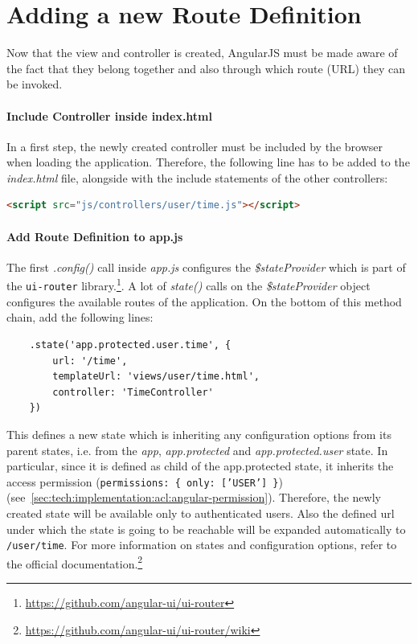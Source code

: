 \documentclass[nochapterpage,nopartpage,noheadingspace,numbersubsubsec,bigchapter,colorback,accentcolor=tud9c,10pt]{tudreport}
\begin{document}
  \section{Adding a new Route Definition}
  \label{sec:tech:handson:add-route}

    Now that the view and controller is created, AngularJS must be made aware of the fact that they belong together and also through which route (URL) they can be invoked.

  \paragraph{Include Controller inside index.html}
    In a first step, the newly created controller must be included by the browser when loading the application. Therefore, the following line has to be added to the \emph{index.html} file, alongside with the include statements of the other controllers:
        \begin{lstlisting}[language=html]
    <script src="js/controllers/user/time.js"></script>
        \end{lstlisting}

  \paragraph{Add Route Definition to app.js}
    The first \emph{.config()} call inside \emph{app.js} configures the \emph{\$stateProvider} which is part of the \texttt{ui-router} library.\footnote{\url{https://github.com/angular-ui/ui-router}}. A lot of \emph{state()} calls on the \emph{\$stateProvider} object configures the available routes of the application. On the bottom of this method chain, add the following lines:
        \begin{lstlisting}
    .state('app.protected.user.time', {
        url: '/time',
        templateUrl: 'views/user/time.html',
        controller: 'TimeController'
    })
        \end{lstlisting}
    This defines a new state which is inheriting any configuration options from its parent states, i.e. from the \emph{app}, \emph{app.protected} and \emph{app.protected.user} state. In particular, since it is defined as child of the app.protected state, it inherits the access permission (\texttt{permissions: \{ only: ['USER'] \}}) (see~\ref{sec:tech:implementation:acl:angular-permission}). Therefore, the newly created state will be available only to authenticated users. Also the defined url under which the state is going to be reachable will be expanded automatically to \texttt{/user/time}. For more information on states and configuration options, refer to the official documentation.\footnote{\url{https://github.com/angular-ui/ui-router/wiki}}
\end{document}
